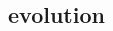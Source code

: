 \documentclass[compress]{beamer}
\begin{document}
\begin{frame}[fragile]
\begin{overlayarea}{\textwidth}{\textheight}
\begin{columns}
\begin{column}{7.7cm}
    \end{column}
    \begin{column}{4cm}
    \end{column}
  \end{columns}
\end{overlayarea}

\end{frame}



\subsection*{evolution}
\end{document}
